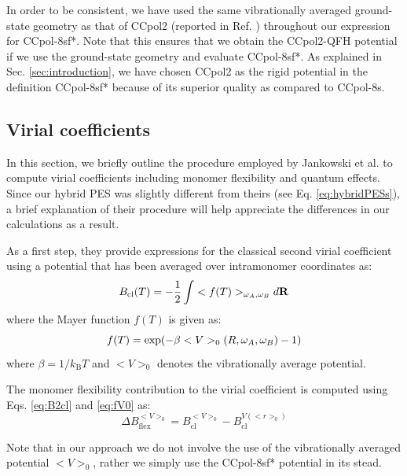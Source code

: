             
            In order to be consistent, we have used the same vibrationally averaged ground-state geometry as that of CCpol2 (reported in Ref. \cite{Gora2014}) throughout our expression for CCpol-8sf*. Note that this ensures that we obtain the CCpol2-QFH potential if we use the ground-state geometry and evaluate CCpol-8sf*. As explained in Sec. \ref{sec:introduction}, we have chosen CCpol2 as the rigid potential in the definition CCpol-8sf* because of its superior quality as compared to CCpol-8s.
        
        \subsection{Virial coefficients}
            In this section, we briefly outline the procedure employed by Jankowski et al. \cite{Jankowski2015} to compute virial coefficients including monomer flexibility and quantum effects. Since our hybrid PES was slightly different from theirs (see Eq. \eqref{eq:hybridPESs}), a brief explanation of their procedure will help appreciate the differences in our calculations as a result.

            As a first step, they provide expressions for the classical second virial coefficient using a potential that has been averaged over intramonomer coordinates as:
            \begin{equation}
                \label{eq:B2cl}
                B_{\text{cl}} (T) = -\displaystyle\frac{1}{2} \int <f(T)>_{\omega_A, \omega_B} d{\mathbf {R}}
            \end{equation}
            where the Mayer function $f(T)$ is given as:
            \begin{equation}
                \label{eq:fV0}
                f(T) = \exp ( -\beta <V>_0 (R, {\mathbf {\omega}}_A, {\mathbf {\omega}}_B) - 1)
            \end{equation}
            where $\beta = 1/k_\text{B} T$ and $<V>_0$ denotes the vibrationally average potential.

            The monomer flexibility contribution to the virial coefficient is computed using Eqs. \eqref{eq:B2cl}  and \eqref{eq:fV0} as:
            \begin{equation}
                \label{eq:deltaBFlex}
                \Delta B_\text{flex}^{<V>_0} = B_\text{cl}^{<V>_0} -  B_\text{cl}^{V(<r>_0)}
            \end{equation}
            
            Note that in our approach we do not involve the use of the vibrationally averaged potential $<V>_0$, rather we simply use the CCpol-8sf* potential in its stead. 

